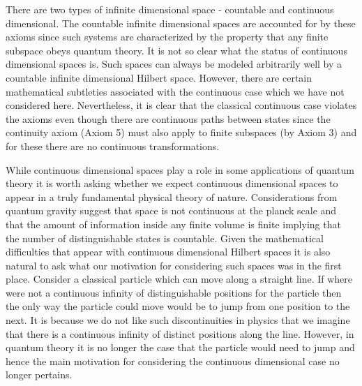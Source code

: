 \documentclass[10pt,twocolumn]{article}
\begin{document}
There are two types of infinite dimensional space - countable and
continuous dimensional.  The countable infinite dimensional spaces are
accounted for by these axioms since
such systems are characterized by the property that any finite subspace
obeys quantum theory.
It is not so clear what the status of continuous dimensional spaces is.
Such spaces can always be modeled arbitrarily well by a countable
infinite dimensional Hilbert space.  However, there are certain
mathematical subtleties associated with the continuous case which we
have not considered here.  Nevertheless, it is clear that the classical
continuous
case violates the axioms even though there are continuous paths between
states since the continuity axiom (Axiom 5) must also apply to finite
subspaces (by Axiom 3) and for these there are no continuous
transformations.


While continuous dimensional spaces play a role in some
applications of quantum theory it is worth asking whether we expect
continuous dimensional spaces to appear in a truly fundamental physical
theory of nature.  Considerations from quantum gravity suggest that
space is not continuous at the planck scale and that the amount of
information inside any finite volume is finite implying that the
number of distinguishable states is countable.  Given the mathematical
difficulties that appear with continuous dimensional Hilbert spaces it
is also natural to ask what our motivation for considering such spaces
was in the first place.  Consider a classical particle which can move along a
straight line.  If where were not a continuous infinity of distinguishable
positions for the particle then the only way the particle could move
would be to jump from one position to the next. It is because we do not
like such discontinuities in physics that we imagine that
there is a continuous infinity of distinct positions along the line.
However, in
quantum theory it is no longer the case that the particle would need to
jump and hence the main motivation for considering the continuous
dimensional case no longer pertains.
\end{document}
